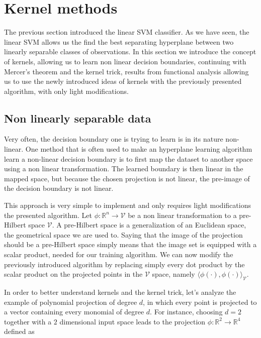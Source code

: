 \section{Kernel methods}

The previous section introduced the linear SVM classifier. As we have seen, the linear SVM  allows us the find the best separating hyperplane between two linearly separable classes of observations. In this section we introduce the concept of kernels, allowing us to learn non linear decision boundaries, continuing with Mercer's theorem and the kernel trick, results from functional analysis allowing us to use the newly introduced ideas of kernels with the previously presented algorithm, with only light modifications.

\subsection{Non linearly separable data}

Very often, the decision boundary one is trying to learn is in its nature non-linear. One method that is often used to make an hyperplane learning algorithm learn a non-linear decision boundary is to first map the dataset to another space using a non linear transformation. The learned boundary is then linear in the mapped space, but because the chosen projection is not linear, the pre-image of the decision boundary is not linear.

This approach is very simple to implement and only requires light modifications the presented algorithm. Let $\phi : \mathbb{R}^n \rightarrow \mathcal{V}$ be a non linear transformation to a pre-Hilbert space $\mathcal{V}$. A pre-Hilbert space is a generalization of an Euclidean space, the geometrical space we are used to. Saying that the image of the projection should be a pre-Hilbert space simply means that the image set is equipped with a scalar product, needed for our training algorithm. We can now modify the previously introduced algorithm by replacing simply every dot product by the scalar product on the projected points in the $\mathcal{V}$ space, namely $\langle \phi(\cdot), \phi(\cdot)\rangle _{\mathcal{V}}$.

In order to better understand kernels and the kernel trick, let's analyze the example of polynomial projection of degree $d$, in which every point is projected to a vector containing every monomial of degree $d$. For instance, choosing $d = 2$ together with a $2$ dimensional input space leads to the projection $\phi : \mathbb{R}^2 \rightarrow \mathbb{R}^4$ defined as

